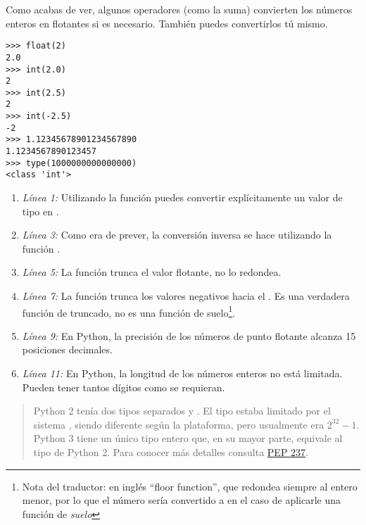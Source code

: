 Como acabas de ver, algunos operadores (como la suma) convierten los números enteros en flotantes si es necesario. También puedes convertirlos tú mismo.

\noindent\begin{minipage}{\textwidth}
\begin{lstlisting}[mathescape=True]
>>> float(2)
2.0
>>> int(2.0)
2
>>> int(2.5)
2
>>> int(-2.5)
-2
>>> 1.12345678901234567890
1.1234567890123457
>>> type(1000000000000000)
<class 'int'>
\end{lstlisting}
\end{minipage}

\begin{enumerate}

\item \emph{Línea 1:} Utilizando la función  puedes convertir explícitamente un valor de tipo  en .

\item \emph{Línea 3:} Como era de prever, la conversión inversa se hace utilizando la función .

\item \emph{Línea 5:} La función  trunca el valor flotante, no lo redondea.

\item \emph{Línea 7:} La función  trunca los valores negativos hacia el . Es una verdadera función de truncado, no es una función de suelo\footnote{Nota del traductor: en inglés ``floor function'', que redondea siempre al entero menor, por lo que el número  sería convertido a  en el caso de aplicarle una función de \emph{suelo}}.

\item \emph{Línea 9:} En Python, la precisión de los números de punto flotante alcanza 15 posiciones decimales.

\item \emph{Línea 11:} En Python, la longitud de los números enteros no está limitada. Pueden tener tantos dígitos como se requieran.

\end{enumerate}

\begin{quote}
Python 2 tenía dos tipos separados  y . El tipo  estaba limitado por el sistema , siendo diferente según la plataforma, pero usualmente era $2^{32} - 1$. Python 3 tiene un único tipo entero que, en su mayor parte, equivale al tipo  de Python 2. Para conocer más detalles consulta \href{http://www.python.org/dev/peps/pep-0237}{PEP 237}.
\end{quote}

